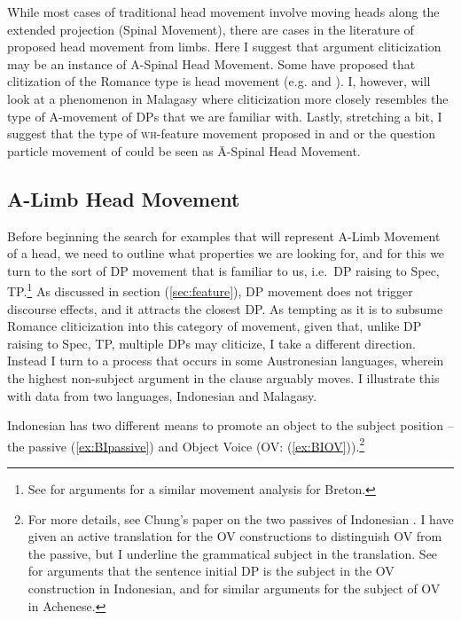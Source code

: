 \documentclass[output=paper,colorlinks,citecolor=brown,
]{langscibook}
\begin{document}
 While most cases of traditional head movement involve moving heads along the extended projection (Spinal Movement), there are cases in the literature of proposed head movement from limbs.  Here I suggest that argument cliticization may be an instance of A-Spinal Head Movement.  Some have proposed that clitization of the Romance type is head movement (e.g. \citet{Roberts:2010} and \citet{Preminger:2019}). I, however, will look at a phenomenon in Malagasy where cliticization more closely resembles the type of A-movement of DPs that we are familiar with.  Lastly, stretching a bit, I suggest that the type of \textsc{wh}-feature movement proposed in \citet{Cheng:2000b} and \citet{Donati:2006} or the question particle movement of \citet{Hagstrom:2000} could be seen as \=A-Spinal Head Movement.

\subsection{A-Limb Head Movement}

Before beginning the search for examples that will represent A-Limb Movement of a head, we need to outline what properties we are looking for, and for this we turn to the sort of DP movement that is familiar to us, i.e.\ DP raising to Spec, TP.\footnote{See \citet{Baker:1990} for arguments for a similar movement analysis for Breton.}  As discussed in section (\ref{sec:feature}), DP movement does not trigger discourse effects, and it attracts the closest DP.  As tempting as it is to subsume Romance cliticization into this category of movement, given that, unlike DP raising to Spec, TP, multiple DPs may cliticize, I take a different direction. Instead I turn to a process that occurs in some Austronesian languages, wherein  the highest non-subject argument in the clause arguably moves.  I illustrate this with data from two languages, Indonesian and Malagasy.

Indonesian has two different means to promote an object to the subject position -- the passive (\ref{ex:BIpassive}) and Object Voice (OV: (\ref{ex:BIOV})).\footnote{For more details, see Chung's paper on the two passives of Indonesian \citep{Chung:1976a}. I have given an active translation for the OV constructions to distinguish OV from the passive, but I underline the grammatical subject in the translation.  See \citet{Chung:1976a} for arguments that the sentence initial DP is the subject in the OV construction in Indonesian, and \citet{Legate:2014} for similar arguments for the subject of OV in Achenese.}
\end{document}
